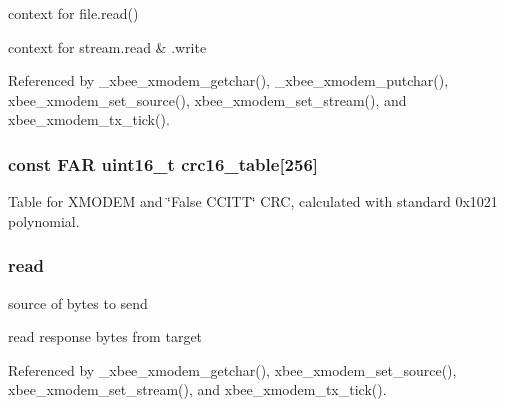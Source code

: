 context for file.\-read() 

context for stream.\-read \& .write 

Referenced by \-\_\-xbee\-\_\-xmodem\-\_\-getchar(), \-\_\-xbee\-\_\-xmodem\-\_\-putchar(), xbee\-\_\-xmodem\-\_\-set\-\_\-source(), xbee\-\_\-xmodem\-\_\-set\-\_\-stream(), and xbee\-\_\-xmodem\-\_\-tx\-\_\-tick().

\hypertarget{group__util__xmodem_gab903230030042c3ee444aa887b705e06}{
\subsubsection[{crc16\-\_\-table}]{\setlength{\rightskip}{0pt plus 5cm}const {\bf F\-A\-R} {\bf uint16\-\_\-t} crc16\-\_\-table\mbox{[}256\mbox{]}}}\label{group__util__xmodem_gab903230030042c3ee444aa887b705e06}


Table for X\-M\-O\-D\-E\-M and \char`\"{}\-False C\-C\-I\-T\-T\char`\"{} C\-R\-C, calculated with standard 0x1021 polynomial. 

\hypertarget{group__util__xmodem_gac73e7e9b654a58e232f8c1380cd68dfa}{
\subsubsection[{read}]{ read}}\label{group__util__xmodem_gac73e7e9b654a58e232f8c1380cd68dfa}


source of bytes to send 

read response bytes from target 

Referenced by \-\_\-xbee\-\_\-xmodem\-\_\-getchar(), xbee\-\_\-xmodem\-\_\-set\-\_\-source(), xbee\-\_\-xmodem\-\_\-set\-\_\-stream(), and xbee\-\_\-xmodem\-\_\-tx\-\_\-tick().

